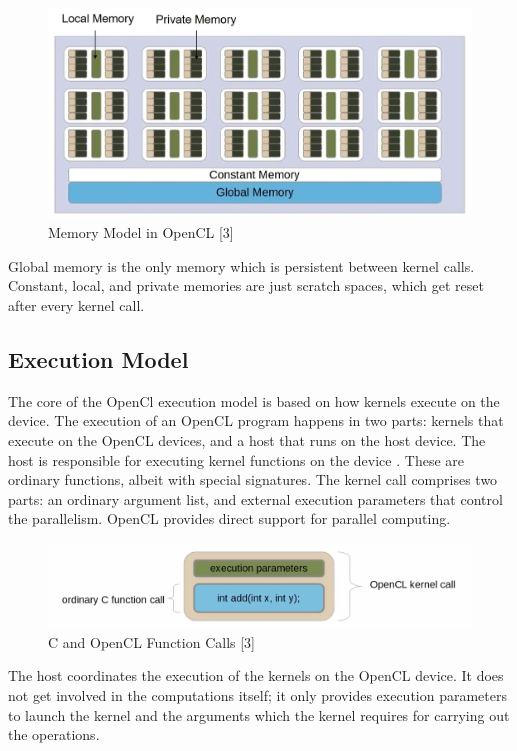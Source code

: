 \begin{itemize}
\begin{figure}[h!]
  \includegraphics[width=\linewidth]{figures/OpenCL_Memory_Model.jpg}
  \caption{Memory Model in OpenCL [3]}
  \label{fig:opencl2}
\end{figure}
\end{itemize}
Global memory is the only memory which is persistent between kernel calls. Constant, local, and private memories are just scratch spaces, which get reset after every kernel call.

 \subsection{Execution Model}
The core of the OpenCl execution model is based on how kernels execute on the device. The execution of an OpenCL program happens in two parts: kernels that execute on the OpenCL devices, and a host that runs on the host device. The host is responsible for executing kernel functions on the device \cite{opencl_khronos}. These are ordinary functions, albeit with special signatures. The kernel call comprises two parts: an ordinary argument list, and external execution parameters that control the parallelism. OpenCL provides direct support for parallel computing. \newline\newline
\begin{figure}[h!]
\includegraphics[width=\linewidth]{figures/C_and_OpenCL_Function_Calls.png}
\caption{C and OpenCL Function Calls [3]}
\label{fig:opencl3}
\end{figure}
The host coordinates the execution of the kernels on the OpenCL device. It does not get involved in the computations itself; it only provides execution parameters to launch the kernel and the arguments which the kernel requires for carrying out the operations. 
